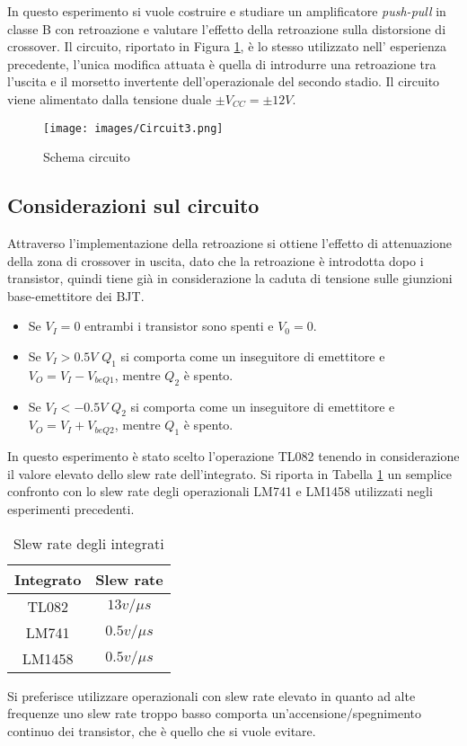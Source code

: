 In questo esperimento si vuole costruire e studiare un amplificatore \textit{push-pull} in classe B con retroazione e valutare l'effetto della retroazione sulla distorsione di crossover. Il circuito, riportato in Figura \ref{fig:Circuito3}, è lo stesso utilizzato nell' esperienza precedente, l'unica modifica attuata è quella di introdurre una retroazione tra l'uscita e il morsetto invertente dell'operazionale del secondo stadio. Il circuito viene alimentato dalla tensione duale $\pm V_{CC}=\pm 12V$.
\begin{figure}[H]
    \centering
    \texttt{[image: images/Circuit3.png]}
    \caption{Schema circuito}
    \label{fig:Circuito3}
\end{figure}
\subsection{Considerazioni sul circuito}
Attraverso l’implementazione della retroazione si ottiene l’effetto di attenuazione della zona di crossover in uscita, dato che la retroazione è introdotta dopo i transistor, quindi tiene già in considerazione la caduta di tensione sulle giunzioni base-emettitore dei BJT.
\begin{itemize}
    \item Se $V_I=0$ entrambi i transistor sono spenti e $V_0=0$.
    \item Se $V_I > 0.5 V$ $Q_1$ si comporta come un inseguitore di emettitore e $V_O = V_I - V_{beQ1}$, mentre $Q_2$ è spento. 
    \item Se $V_I < -0.5V$ $Q_2$ si comporta come un inseguitore di emettitore e $V_O = V_I + V_{beQ2}$, mentre $Q_1$ è spento.
\end{itemize}
\noindent In questo esperimento è stato scelto l'operazione TL082 tenendo in considerazione il valore elevato dello slew rate dell'integrato. Si riporta in Tabella \ref{tab:slewrate} un semplice confronto con lo slew rate degli operazionali LM741 e LM1458 utilizzati negli esperimenti precedenti.
\begin{table}[H]
    \centering
    \begin{tabular}{|c|c|}
        \hline
        Integrato&Slew rate\\\hline
        TL082&$13v/\mu s$\\\hline
        LM741&$0.5v/\mu s$\\\hline
        LM1458&$0.5v/\mu s$\\\hline
    \end{tabular}
    \caption{Slew rate degli integrati}
    \label{tab:slewrate}
\end{table}
Si preferisce utilizzare operazionali con slew rate elevato in quanto ad alte frequenze uno slew rate troppo basso comporta un'accensione/spegnimento continuo dei transistor, che è quello che si vuole evitare.
